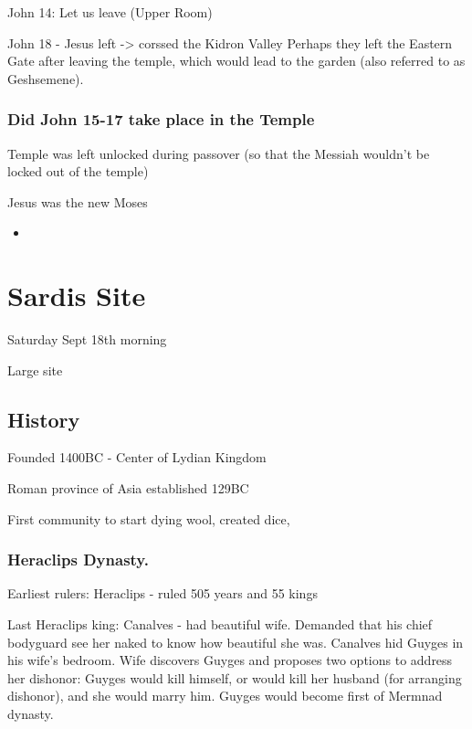 \documentclass[
]{book}
\providecommand{\tightlist}{%
  \setlength{\itemsep}{0pt}\setlength{\parskip}{0pt}}
\begin{document}
John 14: Let us leave (Upper Room)

John 18 - Jesus left -\textgreater{} corssed the Kidron Valley
Perhaps they left the Eastern Gate after leaving the temple, which would lead to the garden (also referred to as Geshsemene).

\hypertarget{did-john-15-17-take-place-in-the-temple}{%
\subsection{Did John 15-17 take place in the Temple}\label{did-john-15-17-take-place-in-the-temple}}

Temple was left unlocked during passover (so that the Messiah wouldn't be locked out of the temple)

Jesus was the new Moses

\begin{itemize}
\tightlist
\item
\end{itemize}

\hypertarget{sardis-site}{%
\chapter{Sardis Site}\label{sardis-site}}

Saturday Sept 18th morning

Large site

\hypertarget{history-5}{%
\section{History}\label{history-5}}

Founded 1400BC - Center of Lydian Kingdom

Roman province of Asia established 129BC

First community to start dying wool, created dice,

\hypertarget{heraclips-dynasty.}{%
\subsection{Heraclips Dynasty.}\label{heraclips-dynasty.}}

Earliest rulers: Heraclips - ruled 505 years and 55 kings

Last Heraclips king: Canalves - had beautiful wife. Demanded that his chief bodyguard see her naked to know how beautiful she was. Canalves hid Guyges in his wife's bedroom. Wife discovers Guyges and proposes two options to address her dishonor: Guyges would kill himself, or would kill her husband (for arranging dishonor), and she would marry him. Guyges would become first of Mermnad dynasty.
\end{document}
